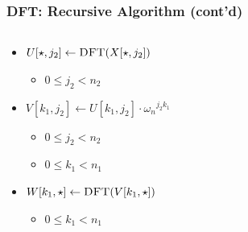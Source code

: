 \documentclass[xcolor={rgb,x11names,svgnames},rgb,x11names,svgnames]{beamer}
\begin{document}


\begin{frame}[label=fftdef, fragile]
  \frametitle{DFT: Recursive Algorithm (cont'd)}

  \begin{overlayarea}{\textwidth}{2cm}
      
  
\end{overlayarea}

\begin{overlayarea}{\textwidth}{8cm}
  \begin{columns}[T]
    \begin{column}{6cm}
      \small 
      \begin{itemize}
      \item<2-> $U[\star, j_2] \gets \textsc{DFT}(X[\star, j_2])$
        \begin{itemize}
        \item $0 \leq j_2 < n_2$
        \end{itemize}

      \item<3-> $V[k_1, j_2] \gets U[k_1, j_2] \cdot {\omega_n}^{j_2 k_1}$
        \begin{itemize}
        \item $0 \leq j_2 < n_2$
        \item $0 \leq k_1 < n_1$ 
        \end{itemize}
        
      \item<4-> $W[k_1, \star] \gets \textsc{DFT}(V[k_1, \star])$
        \begin{itemize}
        \item $0 \leq k_1 < n_1$
        \end{itemize}


\end{itemize}
\end{column}
\end{columns}
\end{overlayarea}
\end{frame}
\end{document}
